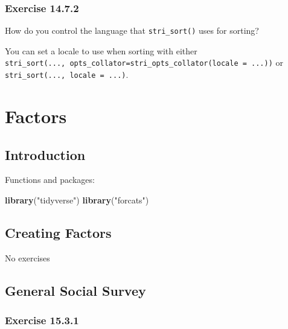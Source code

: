 \documentclass[]{book}
\newenvironment{Shaded}{\begin{snugshade}}{\end{snugshade}}
\newcommand{\KeywordTok}[1]{\textcolor[rgb]{0.13,0.29,0.53}{\textbf{#1}}}
\newcommand{\NormalTok}[1]{#1}
\newcommand{\StringTok}[1]{\textcolor[rgb]{0.31,0.60,0.02}{#1}}
\theoremstyle{plain}
\theoremstyle{remark}
\theoremstyle{definition}
\theoremstyle{definition}
\theoremstyle{definition}
\theoremstyle{remark}
\begin{document}
\hypertarget{exercise-14.7.2}{%
\subsection*{\texorpdfstring{Exercise
{14.7.2}}{Exercise 14.7.2}}\label{exercise-14.7.2}}

How do you control the language that \texttt{stri\_sort()} uses for
sorting?

You can set a locale to use when sorting with either
\texttt{stri\_sort(...,\ opts\_collator=stri\_opts\_collator(locale\ =\ ...))}
or \texttt{stri\_sort(...,\ locale\ =\ ...)}.

\hypertarget{factors}{%
\chapter{Factors}\label{factors}}

\hypertarget{introduction-10}{%
\section{Introduction}\label{introduction-10}}

Functions and packages:

\begin{Shaded}
\begin{Highlighting}[]
\KeywordTok{library}\NormalTok{(}\StringTok{"tidyverse"}\NormalTok{)}
\KeywordTok{library}\NormalTok{(}\StringTok{"forcats"}\NormalTok{)}
\end{Highlighting}
\end{Shaded}

\hypertarget{creating-factors}{%
\section{Creating Factors}\label{creating-factors}}

No exercises

\hypertarget{general-social-survey}{%
\section{General Social Survey}\label{general-social-survey}}

\hypertarget{exercise-15.3.1}{%
\subsection*{\texorpdfstring{Exercise
{15.3.1}}{Exercise 15.3.1}}\label{exercise-15.3.1}}
\end{document}
